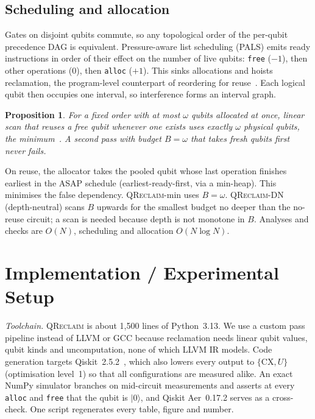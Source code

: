 \documentclass[conference,a4paper]{IEEEtran}
\newtheorem{proposition}{Proposition}
\newcommand{\QR}{\textup{\textsc{QReclaim}}}
\newcommand{\instr}[1]{\texttt{#1}}
\begin{document}
\subsection{Scheduling and allocation}
\label{sec:alloc}
Gates on disjoint qubits commute, so any topological order of the per-qubit precedence DAG is equivalent. Pressure-aware list scheduling (PALS) emits ready instructions in order of their effect on the number of live qubits: \instr{free} ($-1$), then other operations ($0$), then \instr{alloc} ($+1$). This sinks allocations and hoists reclamation, the program-level counterpart of reordering for reuse~\cite{caqr,jiang2024,classiq2025}. Each logical qubit then occupies one interval, so interference forms an interval graph.

\begin{proposition}\label{prop:opt}
For a fixed order with at most $\omega$ qubits allocated at once, linear scan that reuses a free qubit whenever one exists uses exactly $\omega$ physical qubits, the minimum~\cite{linearscan}. A second pass with budget $B=\omega$ that takes fresh qubits first never fails.
\end{proposition}

On reuse, the allocator takes the pooled qubit whose last operation finishes earliest in the ASAP schedule (earliest-ready-first, via a min-heap). This minimises the false dependency. \QR{}-min uses $B=\omega$. \QR{}-DN (depth-neutral) scans $B$ upwards for the smallest budget no deeper than the no-reuse circuit; a scan is needed because depth is not monotone in $B$. Analyses and checks are $O(N)$, scheduling and allocation $O(N\log N)$.

\section{Implementation / Experimental Setup}
\label{sec:impl}
\emph{Toolchain.} \QR{} is about 1{,}500 lines of Python~3.13. We use a custom pass pipeline instead of LLVM or GCC because reclamation needs linear qubit values, qubit kinds and uncomputation, none of which LLVM IR models. Code generation targets Qiskit~2.5.2~\cite{qiskit2024}, which also lowers every output to $\{\mathrm{CX},U\}$ (optimisation level~1) so that all configurations are measured alike. An exact NumPy simulator branches on mid-circuit measurements and asserts at every \instr{alloc} and \instr{free} that the qubit is $|0\rangle$, and Qiskit Aer~0.17.2 serves as a cross-check. One script regenerates every table, figure and number.
\end{document}
